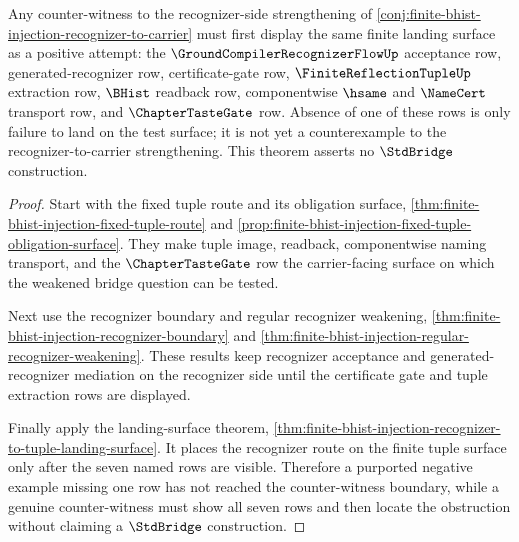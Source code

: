 \begin{theorem}
\label{thm:finite-bhist-injection-recognizer-landing-counter-witness}
Any counter-witness to the recognizer-side strengthening of \autoref{conj:finite-bhist-injection-recognizer-to-carrier} must first display the same finite landing surface as a positive attempt: the $\GroundCompilerRecognizerFlowUp$ acceptance row, generated-recognizer row, certificate-gate row, $\FiniteReflectionTupleUp$ extraction row, $\BHist$ readback row, componentwise $\hsame$ and $\NameCert$ transport row, and $\ChapterTasteGate$ row. Absence of one of these rows is only failure to land on the test surface; it is not yet a counterexample to the recognizer-to-carrier strengthening. This theorem asserts no $\StdBridge$ construction.
\end{theorem}
\begin{proof}
Start with the fixed tuple route and its obligation surface, \autoref{thm:finite-bhist-injection-fixed-tuple-route} and \autoref{prop:finite-bhist-injection-fixed-tuple-obligation-surface}. They make tuple image, readback, componentwise naming transport, and the $\ChapterTasteGate$ row the carrier-facing surface on which the weakened bridge question can be tested.

Next use the recognizer boundary and regular recognizer weakening, \autoref{thm:finite-bhist-injection-recognizer-boundary} and \autoref{thm:finite-bhist-injection-regular-recognizer-weakening}. These results keep recognizer acceptance and generated-recognizer mediation on the recognizer side until the certificate gate and tuple extraction rows are displayed.

Finally apply the landing-surface theorem, \autoref{thm:finite-bhist-injection-recognizer-to-tuple-landing-surface}. It places the recognizer route on the finite tuple surface only after the seven named rows are visible. Therefore a purported negative example missing one row has not reached the counter-witness boundary, while a genuine counter-witness must show all seven rows and then locate the obstruction without claiming a $\StdBridge$ construction.
\end{proof}


